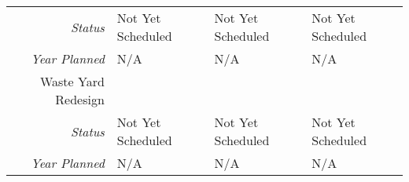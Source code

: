 \begin{tabularx}{\textwidth}{r|X|X|X|}
        \multicolumn{1}{|r|}{\cellcolor{ccorangelight}\textit{Status}}                & Not Yet Scheduled                                                         & Not Yet Scheduled                                                         & Not Yet Scheduled                                                         \\
        \multicolumn{1}{|r|}{\cellcolor{ccorangelight}\textit{Year Planned}}                  & N/A                                                     & N/A                                                     & N/A                                                     \\ \hline
\multicolumn{1}{|V{.2\columnwidth}|}{\cellcolor{ccorangelight}Waste Yard Redesign}          &                                                                  &                                                                  &                                                                  \\
        \multicolumn{1}{|r|}{\cellcolor{ccorangelight}\textit{Status}}                & Not Yet Scheduled                                                         & Not Yet Scheduled                                                         & Not Yet Scheduled                                                         \\
        \multicolumn{1}{|r|}{\cellcolor{ccorangelight}\textit{Year Planned}}                  & N/A                                                     & N/A                                                     & N/A                                                     \\ \hline
\end{tabularx}